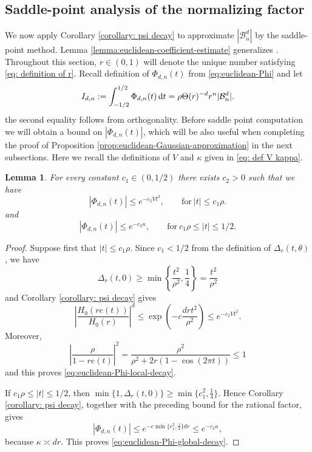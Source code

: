 \documentclass{article}
\newcommand{\dd}{\mathop{}\!\mathrm{d}}
\theoremstyle{plain}
\newtheorem{lemma}[theorem]{Lemma}
\numberwithin{equation}{section}
\begin{document}
\subsection{Saddle-point analysis of the normalizing factor}
We now apply Corollary \ref{corollary: psi decay} to approximate $|\mathcal B_{n}^d|$ by the saddle-point method. Lemma \ref{lemma:euclidean-coefficient-estimate} generalizes \cite[Theorem~3.4, (3.4)]{NiksinskiWrobel}. Throughout this section, $r \in (0,1)$ will denote the unique number satisfying \eqref{eq: definition of r}. Recall 
definition of $\Phi_{d,n}(t)$ from \eqref{eq:euclidean-Phi} and let
\begin{equation} \label{eq: defn of I_{d,n} }
    I_{d,n}:= \int_{-1/2}^{1/2} \Phi_{d,n}(t) \dd t =\rho \Theta(r)^{-d} r^n |\mathcal{B}_n^d|.
\end{equation}
the second equality follows from orthogonality. Before saddle point computation we will obtain a bound on $|\Phi_{d,n}(t)|$, which will be also useful when completing the proof of Proposition \ref{prop:euclidean-Gaussian-approximation} in the next subsections. Here we recall the definitions of $V$ and $\kappa$ given in \eqref{eq: def V kappa}. 
\begin{lemma} \label{lemma:decay of Phi} For every constant $c_1 \in (0,1/2)$ there exists $c_2>0$ such that we have
\begin{equation}\label{eq:euclidean-Phi-local-decay}
 |\Phi_{d,n}(t)|\leq e^{-c_2Vt^2},
 \qquad \text{for} \ |t|\leq c_1\rho.
\end{equation}
and
\begin{equation}\label{eq:euclidean-Phi-global-decay}
 |\Phi_{d,n}(t)|\leq e^{-c_2\kappa}, \qquad \text{for} \ c_1 \rho \le |t| \le 1/2.
\end{equation}
\end{lemma}
\begin{proof}
Suppose first that $|t|\leq c_1\rho$. {Since $c_1<1/2$ from the definition of $ \Delta_r(t,\theta)$, we have
\[
 \Delta_r(t,0)\geq
 \min\left\{\frac{t^2}{\rho^2},\frac14\right\}=\frac{t^2}{\rho^2}
\]
and Corollary \ref{corollary: psi decay} gives
\[
 \left|\frac{H_0(re(t))}{H_0(r)}\right|^d
 \leq
 \exp\left(-c\frac{drt^2}{\rho^2}\right)
 \leq e^{-c_2Vt^2}.
\]}
Moreover,
\[
 \left|\frac{\rho}{1-re(t)}\right|^2
 =\frac{\rho^2}{\rho^2+2r(1-\cos(2\pi t))}\leq1
\]
and this proves \eqref{eq:euclidean-Phi-local-decay}.

{If $c_1\rho\leq |t|\leq1/2$, then
$\min\{1,\Delta_r(t,0)\}\ge \min\{c_1^2,\frac14\}$. Hence Corollary
\ref{corollary: psi decay}, together with the preceding bound for the
rational factor, gives
\[
 |\Phi_{d,n}(t)|\leq e^{-c \min\{c_1^2,\frac14\} dr}\leq e^{-c_2\kappa},
\]
because $\kappa\asymp dr$.} This proves \eqref{eq:euclidean-Phi-global-decay}.

\end{proof}
\end{document}
